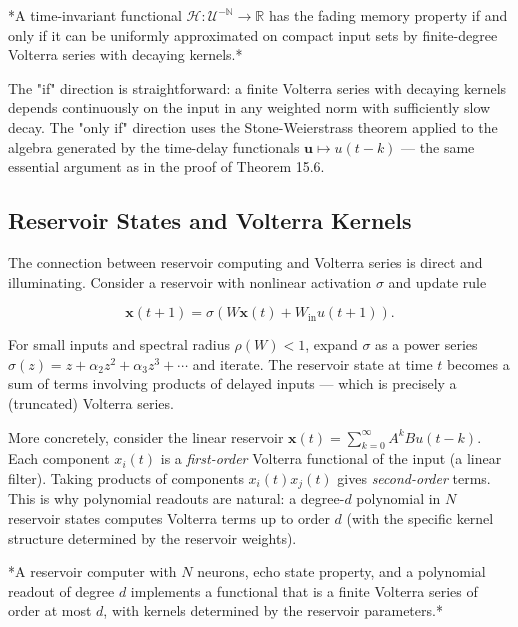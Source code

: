 \begin{theorem}\label{thm:15.14}
*A time-invariant functional
$\mathcal{H}: \mathcal{U}^{-\mathbb{N}} \to \mathbb{R}$ has the fading memory property
if and only if it can be uniformly approximated on compact input sets by finite-degree
Volterra series with decaying kernels.*

The "if" direction is straightforward: a finite Volterra series with decaying kernels
depends continuously on the input in any weighted norm with sufficiently slow decay.
The "only if" direction uses the Stone-Weierstrass theorem applied to the algebra
generated by the time-delay functionals $\mathbf{u} \mapsto u(t-k)$ --- the same
essential argument as in the proof of Theorem 15.6.
\end{theorem}


\subsection{Reservoir States and Volterra Kernels}\label{sec:15.5.3}

The connection between reservoir computing and Volterra series is direct and
illuminating. Consider a reservoir with nonlinear activation $\sigma$ and update rule

\[
\mathbf{x}(t+1) = \sigma(W\mathbf{x}(t) + W_{\text{in}}u(t+1)).
\]

For small inputs and spectral radius $\rho(W) < 1$, expand $\sigma$ as a power series
$\sigma(z) = z + \alpha_2 z^2 + \alpha_3 z^3 + \cdots$ and iterate. The reservoir state
at time $t$ becomes a sum of terms involving products of delayed inputs --- which is
precisely a (truncated) Volterra series.

More concretely, consider the linear reservoir $\mathbf{x}(t) = \sum_{k=0}^\infty A^k B u(t-k)$.
Each component $x_i(t)$ is a \textit{first-order} Volterra functional of the input (a linear
filter). Taking products of components $x_i(t) x_j(t)$ gives \textit{second-order} terms.
This is why polynomial readouts are natural: a degree-$d$ polynomial in $N$ reservoir
states computes Volterra terms up to order $d$ (with the specific kernel structure
determined by the reservoir weights).

\begin{proposition}\label{prop:15.15.}
*A reservoir computer with $N$ neurons, echo state property,
and a polynomial readout of degree $d$ implements a functional that is a finite
Volterra series of order at most $d$, with kernels determined by the reservoir
parameters.*
\end{proposition}


